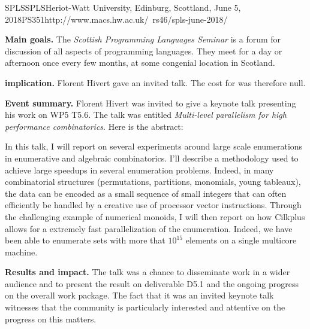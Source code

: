 \begin{event}{SPLS}{SPLS}{Heriot-Watt University, Edinburg, Scottland, June 5, 2018}{PS}{35}{1}{http://www.macs.hw.ac.uk/~rs46/spls-june-2018/}

\textbf{Main goals.}  The \emph{Scottish Programming Languages Seminar} is a
forum for discussion of all aspects of programming languages. They meet for a
day or afternoon once every few months, at some congenial location in
Scotland.

\textbf{\ODK implication.} Florent Hivert gave an invited talk. The cost for
\ODK was therefore null.

\textbf{Event summary.}  Florent Hivert was invited to give a keynote talk
presenting his work on WP5 T5.6. The talk was entitled \emph{ Multi-level
  parallelism for high performance combinatorics}. Here is the abstract:

In this talk, I will report on several experiments around large scale
enumerations in enumerative and algebraic combinatorics.  I'll describe a
methodology used to achieve large speedups in several enumeration
problems. Indeed, in many combinatorial structures (permutations, partitions,
monomials, young tableaux), the data can be encoded as a small sequence of
small integers that can often efficiently be handled by a creative use of
processor vector instructions. Through the challenging example of numerical
monoids, I will then report on how Cilkplus allows for a extremely fast
parallelization of the enumeration. Indeed, we have been able to enumerate
sets with more that $10^15$ elements on a single multicore machine.

\textbf{Results and impact.} The talk was a chance to disseminate \ODK work in
a wider audience and to present the result on deliverable D5.1 and the ongoing
progress on the overall work package. The fact that it was an invited keynote
talk witnesses that the community is particularly interested and attentive on
the \ODK progress on this matters.

\end{event}
